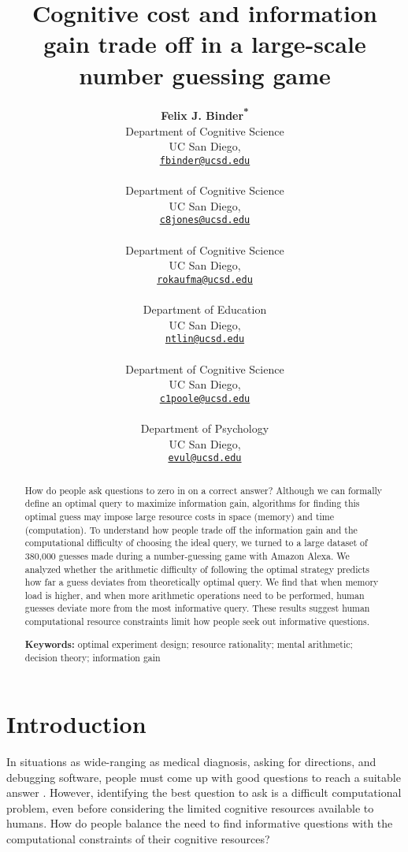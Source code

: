 \documentclass[10pt,letterpaper]{article}
\title{Cognitive cost and information gain trade off in a large-scale number guessing game}
\author{
    {\large \bf Felix J. Binder\textsuperscript{*}} \\
      Department of Cognitive Science \\ UC San Diego,\\
      \texttt{\href{mailto:fbinder@ucsd.edu}{\url{fbinder@ucsd.edu}}} \\
      \And {\large \bf Cameron R. Jones\textsuperscript{*}} \\
      Department of Cognitive Science \\  UC San Diego,\\
      \texttt{\href{mailto:c8jones@ucsd.edu}{\url{c8jones@ucsd.edu}}} \\
      \And {\large \bf Robert A. Kaufman} \\
      Department of Cognitive Science \\  UC San Diego,\\
      \texttt{\href{mailto:rokaufma@ucsd.edu}{\url{rokaufma@ucsd.edu}}} \\
      \AND {\large \bf Naomi T. Lin} \\
      Department of Education \\  UC San Diego,\\
      \texttt{\href{mailto:ntlin@ucsd.edu}{\url{ntlin@ucsd.edu}}} \\
      \And {\large \bf Crystal R. Poole} \\
      Department of Cognitive Science \\  UC San Diego,\\
      \texttt{\href{mailto:c1poole@ucsd.edu}{\url{c1poole@ucsd.edu}}} \\
      \And {\large \bf Edward Vul} \\
      Department of Psychology \\  UC San Diego,\\
      \texttt{\href{mailto:evul@ucsd.edu}{\url{evul@ucsd.edu}}} \\
  }
\begin{document}
\maketitle
\renewcommand*{\thefootnote}{\fnsymbol{footnote}}
\setcounter{footnote}{0}
\renewcommand*{\thefootnote}{\arabic{footnote}} 

\begin{abstract}
How do people ask questions to zero in on a correct answer? Although we can formally define an optimal query to maximize information gain, algorithms for finding this optimal guess may impose large resource costs in space (memory) and time (computation). 
To understand how people trade off the information gain and the computational difficulty of choosing the ideal query, we turned to a large dataset of 380,000 guesses made during a number-guessing game with Amazon Alexa.
We analyzed whether the arithmetic difficulty of following the optimal strategy predicts how far a guess deviates from theoretically optimal query.
We find that when memory load is higher, and when more arithmetic operations need to be performed, human guesses deviate more from the most informative query.
These results suggest human computational resource constraints limit how people seek out informative questions. 


\textbf{Keywords:} 
optimal experiment design; resource rationality; mental arithmetic; decision theory; information gain
\end{abstract}

\section{Introduction}

In situations as wide-ranging as medical diagnosis, asking for directions, and debugging software, people must come up with good questions to reach a suitable answer \cite{coenen2019asking}. 
However, identifying the best question to ask is a difficult computational problem, even before considering the limited cognitive resources available to humans. 
How do people balance the need to find informative questions with the computational constraints of their cognitive resources?
 
\end{document}
